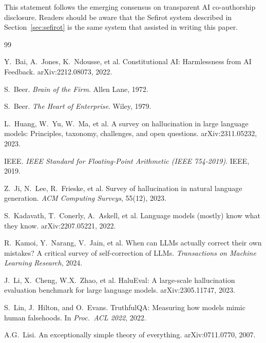 \documentclass[11pt]{article}
\theoremstyle{definition}
\theoremstyle{remark}
\begin{document}
This statement follows the emerging consensus on transparent AI co-authorship
disclosure.  Readers should be aware that the Sefirot system described in
Section~\ref{sec:sefirot} is the same system that assisted in writing this paper.


\begin{thebibliography}{99}

  Y.~Bai, A.~Jones, K.~Ndousse, et al.
  \newblock Constitutional AI: Harmlessness from AI Feedback.
  \newblock arXiv:2212.08073, 2022.

  S.~Beer.
  \newblock \emph{Brain of the Firm}.
  \newblock Allen Lane, 1972.

  S.~Beer.
  \newblock \emph{The Heart of Enterprise}.
  \newblock Wiley, 1979.

  L.~Huang, W.~Yu, W.~Ma, et al.
  \newblock A survey on hallucination in large language models: Principles,
    taxonomy, challenges, and open questions.
  \newblock arXiv:2311.05232, 2023.

  {IEEE}.
  \newblock \emph{IEEE Standard for Floating-Point Arithmetic (IEEE 754-2019)}.
  \newblock IEEE, 2019.

  Z.~Ji, N.~Lee, R.~Frieske, et al.
  \newblock Survey of hallucination in natural language generation.
  \newblock \emph{ACM Computing Surveys}, 55(12), 2023.

  S.~Kadavath, T.~Conerly, A.~Askell, et al.
  \newblock Language models (mostly) know what they know.
  \newblock arXiv:2207.05221, 2022.

  R.~Kamoi, Y.~Narang, V.~Jain, et al.
  \newblock When can LLMs actually correct their own mistakes? A critical survey
    of self-correction of LLMs.
  \newblock \emph{Transactions on Machine Learning Research}, 2024.

  J.~Li, X.~Cheng, W.X.~Zhao, et al.
  \newblock HaluEval: A large-scale hallucination evaluation benchmark for large
    language models.
  \newblock arXiv:2305.11747, 2023.

  S.~Lin, J.~Hilton, and O.~Evans.
  \newblock TruthfulQA: Measuring how models mimic human falsehoods.
  \newblock In \emph{Proc.\ ACL 2022}, 2022.

  A.G.~Lisi.
  \newblock An exceptionally simple theory of everything.
  \newblock arXiv:0711.0770, 2007.


\end{thebibliography}
\end{document}
